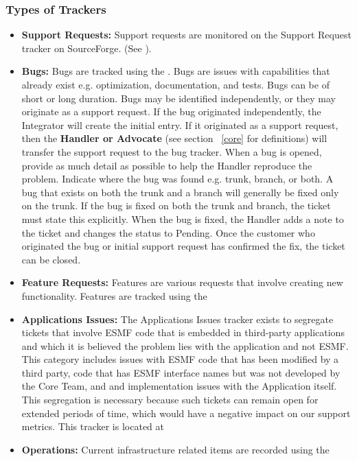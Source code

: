 \subsubsection{Types of Trackers}
\label{sec:trackertypes}
\begin{itemize}
\item {\bf Support Requests:} Support requests are monitored on the Support Request tracker on SourceForge. 
(See ). 

\item {\bf Bugs:} Bugs are tracked using the . Bugs are issues with capabilities that already exist e.g. optimization, documentation, and tests. Bugs can be of short or long duration.  
Bugs may be identified independently, or they may originate as a support request. If the bug originated independently, the Integrator will create the initial entry. If it originated as a support request, then the {\bf Handler or Advocate} (see section ~\ref{core} for definitions) will transfer the support request to the bug tracker. When a bug is opened, provide as much detail as possible to help the Handler reproduce the problem. Indicate where the bug was found e.g. trunk, branch, or both. A bug that exists on both the trunk and a branch will generally be fixed only on the trunk. If the bug is fixed on both the trunk and branch, the ticket must  state this explicitly. When the bug is fixed, the Handler adds a note to the ticket and changes the status to Pending. Once the customer who originated the bug or initial support request has confirmed the fix, the ticket can be closed.

\item {\bf Feature Requests:} Features are various requests that involve creating new functionality. Features are tracked using the 

\item{\bf Applications Issues:} The Applications Issues tracker exists to segregate tickets that
involve ESMF code that is embedded in third-party applications and which it is believed the problem
lies with the application and not ESMF. This category includes issues with ESMF code that
has been modified by a third party, code that has ESMF interface names but was not developed by
the Core Team, and and implementation issues with the Application itself. This segregation is
necessary because such tickets can remain open for extended periods of time, which would have
a negative impact on our support metrics. This tracker is located at

\item {\bf Operations:} Current infrastructure related items are recorded using the
\end{itemize}




